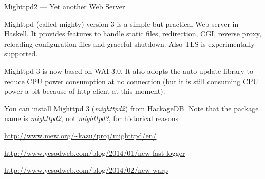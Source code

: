 \begin{hcarentry}[updated]{Mighttpd2 --- Yet another Web Server}
\label{mighttpd2}
\makeheader

Mighttpd (called mighty) version 3 is a simple but practical Web server in Haskell.
It provides features to handle static files, redirection, CGI, reverse proxy, reloading configuration files and graceful shutdown. Also TLS is experimentally supported.

Mighttpd 3 is now based on WAI 3.0. It also adopts the auto-update
library to reduce CPU power consumption at no connection (but it is
still consuming CPU power a bit because of http-client at this moment).

You can install Mighttpd 3 ({\it mighttpd2}) from HackageDB. Note that the package name is {\it mighttpd2}, not {\it mighttpd3}, for historical reasons

\FurtherReading
\begin{compactitem}
\item \url{http://www.mew.org/~kazu/proj/mighttpd/en/}
\item \url{http://www.yesodweb.com/blog/2014/01/new-fast-logger}
\item \url{http://www.yesodweb.com/blog/2014/02/new-warp}
\end{compactitem}
\end{hcarentry}
